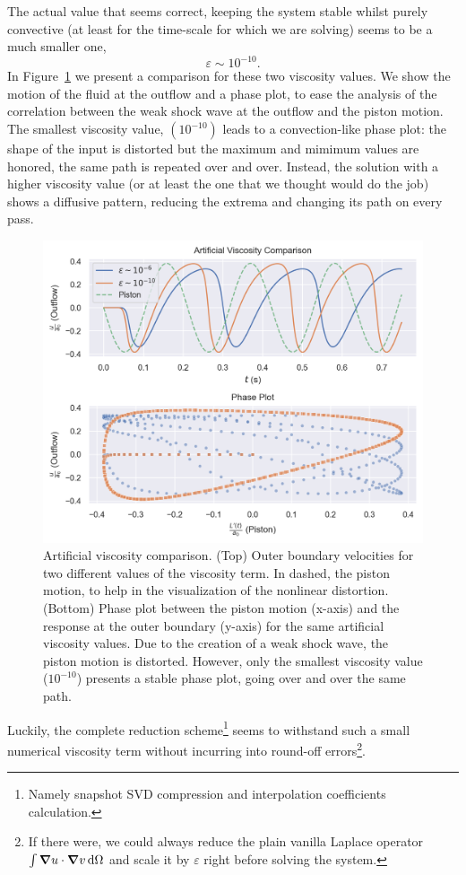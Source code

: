 \documentclass[../../thesis.tex]{subfiles}
\begin{document}
The actual value that seems correct, keeping the system stable whilst purely convective (at least for the time-scale for which we are solving) seems to be a much smaller one,
\begin{equation*}
    \varepsilon \sim 10^{-10}.
\end{equation*}
In Figure~\ref{fig:artificial_viscosity_comparison} we present a comparison for these two viscosity values.
We show the motion of the fluid at the outflow and a phase plot, to ease the analysis of the correlation between the weak shock wave at the outflow and the piston motion.
The smallest viscosity value, $(10^{-10})$ leads to a convection-like phase plot:
the shape of the input is distorted but the maximum and mimimum values are honored, 
the same path is repeated over and over.
Instead, the solution with a higher viscosity value (or at least the one that we thought would do the job) shows a diffusive pattern, reducing the extrema and changing its path on every pass.
\begin{figure}[!h]
    \centering
    \includegraphics[width=1.0\columnwidth]{research_project/piston/figures/artificial_viscosity/artificial_viscosity_comparison.png}
    \caption{Artificial viscosity comparison.
    (Top) Outer boundary velocities for two different values of the viscosity term.
    In dashed, the piston motion, to help in the visualization of the nonlinear distortion.
    (Bottom) Phase plot between the piston motion (x-axis) and the response at the outer boundary (y-axis) for the same artificial viscosity values.
    Due to the creation of a weak shock wave, the piston motion is distorted.
    However, only the smallest viscosity value ($10^{-10}$) presents a stable phase plot, going over and over the same path. 
    }
    \label{fig:artificial_viscosity_comparison}
\end{figure}
Luckily, the complete reduction scheme\footnote{
    Namely snapshot SVD compression and interpolation coefficients calculation.
}
seems to withstand such a small numerical viscosity term without incurring into round-off errors\footnote{If there were, we could always reduce the plain vanilla Laplace operator $\int \grad u \cdot \grad v \, \text{d}\Omega$ and scale it by $\varepsilon$ right before solving the system.}.
\end{document}
